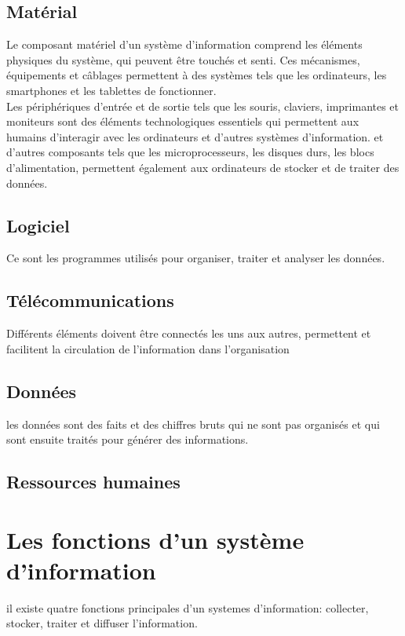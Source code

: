\documentclass[12pt, letterpaper]{article}
\begin{document}
    \subsection{Matérial}
     Le composant matériel d'un système d'information comprend les 
     éléments physiques du système, qui peuvent être touchés et 
     senti. Ces mécanismes, équipements et câblages permettent à 
     des systèmes tels que les ordinateurs, les smartphones et les 
     tablettes de fonctionner.\\
     Les périphériques d'entrée et de sortie tels que les souris, 
     claviers, imprimantes et moniteurs sont des éléments 
     technologiques essentiels qui permettent aux humains d'interagir 
     avec les ordinateurs et d'autres systèmes d'information. et 
     d’autres composants tels que les microprocesseurs, les disques 
     durs, les blocs d'alimentation, permettent également aux 
     ordinateurs de stocker et de traiter des données.
     
     \subsection{Logiciel}
     Ce sont les programmes utilisés pour organiser, traiter et 
     analyser les données.
      
     \subsection{Télécommunications}
     Différents éléments doivent être connectés les uns aux autres, 
     permettent et facilitent la circulation de l’information dans 
     l’organisation
     
     \subsection{Données}
     les données sont des faits et des chiffres bruts qui ne sont pas 
     organisés et qui sont ensuite traités pour générer des informations.
     
     \subsection{Ressources humaines}
     
     
\section{Les fonctions d’un système d’information}
il existe quatre fonctions principales d'un systemes d'information: 
collecter, stocker, traiter et diffuser l’information.
\end{document}
